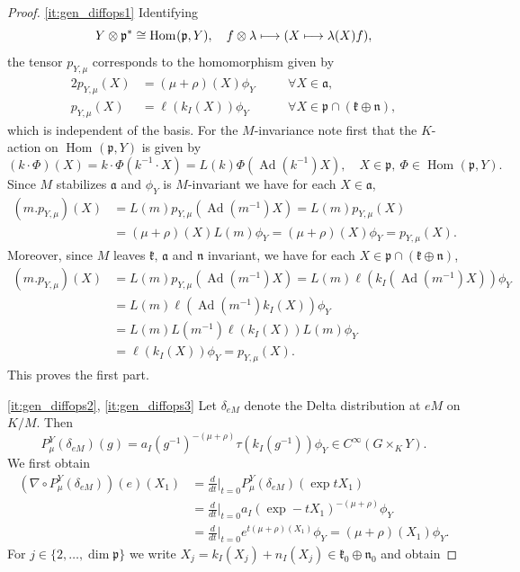 \documentclass[JEP,XML,SOM,NoFloatCountersInSection,Unicode,published]{cedram}
\newcommand\mto{\mathchoice{\longmapsto}{\mapsto}{\mapsto}{\mapsto}}
\let\cdotm\cdot
\theoremstyle{definition}
\renewcommand{\d}[1][t]{\ensuremath{\frac{d}{d#1}\Big|_{#1=0}}}
\newcommand{\mf}[1]{\ensuremath{\mathfrak{#1}}}
\newcommand{\on}[1]{\ensuremath{\operatorname{#1}}}
\newcommand{\Hom}[3]{\ensuremath{\on{Hom}_{#1}(#2,#3)}}
\newcommand{\rhoa}{\ensuremath{\rho}}
\newcommand{\Ik}[1]{\ensuremath{k_I(#1)}}
\newcommand{\In}[1]{\ensuremath{n_I(#1)}}
\begin{document}
\skpt
\begin{proof}
\eqref{it:gen_diffops1} Identifying
\[
Y\otimes\mf p^*\cong\Hom{}{\mf p}{Y},\quad f\otimes\lambda\mto(X\mto\lambda(X)f),
\]
the tensor $p_{Y,\mu}$ corresponds to the homomorphism given by
\begin{alignat*}{2}
p_{Y,\mu}(X)&=(\mu+\rhoa)(X)\phi_Y\quad &&\forall X\in\mf a,\\
p_{Y,\mu}(X)&=\ell(\Ik{X})\phi_Y\ &&\forall X\in\mf p\cap(\mf k\oplus\mf n),
\end{alignat*}
which is independent of the basis. For the $M$-invariance note first that the $K$-action on $\Hom{}{\mf p}{Y}$ is given by
\[
(k\cdotm \Phi)(X)=k\cdotm \Phi(k^{-1}\cdotm X)=L(k)\Phi(\on{Ad}(k^{-1})X),\quad X\in\mf p,\ \Phi\in\Hom{}{\mf p}{Y}.
\]
Since $M$ stabilizes $\mf a$ and $\phi_Y$ is $M$-invariant we have for each $X\in\mf a$,
\begin{align*}
(m.p_{Y,\mu})(X)&=L(m)p_{Y,\mu}(\on{Ad}(m^{-1})X)=L(m)p_{Y,\mu}(X)\\
&=(\mu+\rhoa)(X)L(m)\phi_Y=(\mu+\rhoa)(X)\phi_Y=p_{Y,\mu}(X).
\end{align*}
Moreover, since $M$ leaves $\mf k,\, \mf a$ and $\mf n$ invariant, we have for each $X\in\mf p\cap(\mf k\oplus\mf n)$,
\begin{align*}
(m.p_{Y,\mu})(X)&=L(m)p_{Y,\mu}(\on{Ad}(m^{-1})X)=L(m)\ell(\Ik{\on{Ad}(m^{-1})X})\phi_Y\\
&=L(m)\ell(\on{Ad}(m^{-1})\Ik{X})\phi_Y\\
&=L(m)L(m^{-1})\ell(\Ik{X})L(m)\phi_Y\\
&=\ell(\Ik{X})\phi_Y=p_{Y,\mu}(X).
\end{align*}
This proves the first part.\par
\eqref{it:gen_diffops2}, \eqref{it:gen_diffops3} Let $\delta_{eM}$ denote the Delta distribution at $eM$ on $K/M$. Then
\begin{equation}\label{eq:PT_at_delta}
P_\mu^{Y}(\delta_{eM})(g)=a_{I}(g^{-1})^{-(\mu+\rho)}\tau(k_{I}(g^{-1}))\phi_Y\in C^\infty(G\times_KY).
\end{equation}
We first obtain
\begin{align*}
(\nabla\circ P_\mu^{Y}(\delta_{eM}))(e)(X_1)&=\d P_\mu^{Y}(\delta_{eM})(\exp tX_1)\\
&=\d a_{I}(\exp-tX_1)^{-(\mu+\rho)}\phi_Y\\
&=\d e^{t(\mu+\rhoa)(X_1)}\phi_Y=(\mu+\rhoa)(X_1)\phi_Y.
\end{align*}
For $j\in\{2,\ldots,\dim\mf p\}$ we write $X_j=\Ik{X_j}+\In{X_j}\in\mf k_0\oplus\mf n_0$ and obtain

\end{proof}
\end{document}
